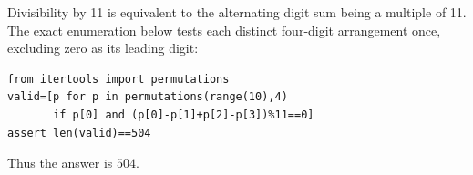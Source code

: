 Divisibility by 11 is equivalent to the alternating digit sum being a multiple of 11. The exact enumeration below tests each distinct four-digit arrangement once, excluding zero as its leading digit:
\begin{verbatim}
from itertools import permutations
valid=[p for p in permutations(range(10),4)
       if p[0] and (p[0]-p[1]+p[2]-p[3])%11==0]
assert len(valid)==504
\end{verbatim}
Thus the answer is $\boxed{504}$.
